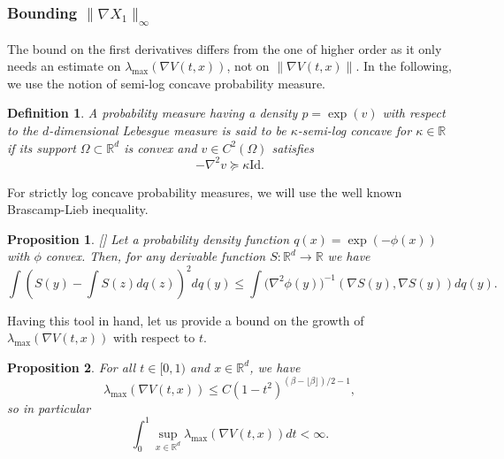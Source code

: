 \documentclass{article}
\newtheorem{definition}{Definition}
\newtheorem{proposition}{Proposition}
\begin{document}
\subsubsection{Bounding $\|\nabla X_1\|_\infty$}

The bound on the first derivatives differs from the one of higher order as it only needs an estimate on $\lambda_{\max}\left(\nabla V(t,x)\right)$, not on $\|\nabla V(t,x)\|$. In the following, we use the notion of semi-log concave probability measure. 
\begin{definition}\label{defi:logconcave}
    A probability measure having a density $p=\exp(v)$ with respect to the $d$-dimensional Lebesgue measure is said to be $\kappa$-semi-log concave for $\kappa\in \mathbb{R}$ if its support $\Omega\subset \mathbb{R}^
    d$ is convex and $v\in C^2(\Omega)$ satisfies
    $$-\nabla^2 v \succeq \kappa \text{Id}.$$
\end{definition}

For strictly log concave probability measures, we will use the well known Brascamp-Lieb inequality.
\begin{proposition}\label{prop:BL}[\cite{BRASCAMP1976366}]
    Let a probability density function $q(x)=\exp(-\phi(x))$ with $\phi$ convex. Then, for any derivable function $S:\mathbb{R}^d\rightarrow \mathbb{R}$ we have $$\int \left(S(y)-\int S(z)dq(z)\right)^2dq(y)\leq \int \big(\nabla^2 \phi(y)\big)^{-1}(\nabla S(y) ,\nabla S(y)) dq(y).$$
\end{proposition}

Having this tool in hand, let us provide a bound on the growth of $\lambda_{\max}(\nabla V(t,x))$ with respect to $t$.

\begin{proposition}\label{prop:boundimpossiblebuty}
For all $t\in [0,1)$ and $x\in \mathbb{R}^d$,  we have
$$\lambda_{\max}(\nabla V(t,x))\leq C(1-t^2)^{(\beta-\lfloor \beta\rfloor)/2-1},$$
so in particular 
    $$\int_0^1 \sup_{x\in \mathbb{R}^d}\lambda_{\max}(\nabla V(t,x))dt<\infty.$$
\end{proposition}
\end{document}
